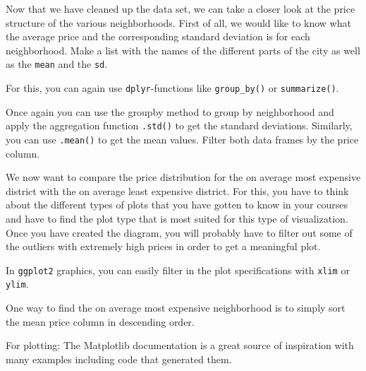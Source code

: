 \documentclass[
  11pt,
]{article}
\newenvironment{tips}[1]
  {
  \begin{itemize}
  \footnotesize
  \renewcommand{\labelitemi}{
    \raisebox{-.7\height}[0pt][0pt]{
      {\setkeys{Gin}{width=3em,keepaspectratio}
        \texttt{[image: images/\#1.png]}}
    }
  }
  \setlength{\fboxsep}{1em}
  \begin{rbox}
  \item
  }
  {
  \end{rbox}
  \end{itemize}
  }
\newenvironment{tipsp}[1]
  {
  \begin{itemize}
  \footnotesize
  \renewcommand{\labelitemi}{
    \raisebox{-.7\height}[0pt][0pt]{
      {\setkeys{Gin}{width=3em,keepaspectratio}
        \texttt{[image: images/\#1.png]}}
    }
  }
  \setlength{\fboxsep}{1em}
  \begin{pbox}
  \item
  }
  {
  \end{pbox}
  \end{itemize}
  }
\begin{document}
Now that we have cleaned up the data set, we can take a closer look at the price structure of the various neighborhoods. First of all, we would like to know what the average price and the corresponding standard deviation is for each neighborhood. Make a list with the names of the different parts of the city as well as the \texttt{mean} and the \texttt{sd}.

\begin{tips}r
For this, you can again use \texttt{dplyr}-functions like \texttt{group\_by()} or \texttt{summarize()}.

\end{tips}

\begin{tipsp}p
Once again you can use the groupby method to group by neighborhood and apply the aggregation function \texttt{.std()} to get the standard deviations. Similarly, you can use \texttt{.mean()} to get the mean values. Filter both data frames by the price column.

\end{tipsp}

We now want to compare the price distribution for the on average most expensive district with the on average least expensive district. For this, you have to think about the different types of plots that you have gotten to know in your courses and have to find the plot type that is most suited for this type of visualization. Once you have created the diagram, you will probably have to filter out some of the outliers with extremely high prices in order to get a meaningful plot.

\begin{tips}r
In \texttt{ggplot2} graphics, you can easily filter in the plot specifications with \texttt{xlim} or \texttt{ylim}.

\end{tips}

\begin{tipsp}p
One way to find the on average most expensive neighborhood is to simply sort the mean price column in descending order.

For plotting: The Matplotlib documentation is a great source of inspiration with many examples including code that generated them.

\end{tipsp}
\end{document}
